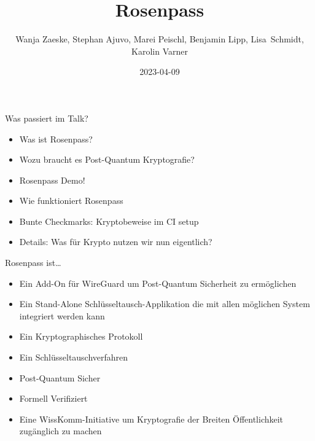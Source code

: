\documentclass{rosenpass-beamer}
\title{Rosenpass}
\author{Wanja Zaeske, Stephan Ajuvo, Marei Peischl, Benjamin Lipp, Lisa~Schmidt, Karolin Varner}
\institute{\url{https://rosenpass.eu}}
\date{2023-04-09}
\begin{document}
\maketitle

\begin{frame}{Was passiert im Talk?}
\begin{itemize}
  \item Was ist Rosenpass?
  \item Wozu braucht es Post-Quantum Kryptografie?
  \item Rosenpass Demo!
  \item Wie funktioniert Rosenpass
  \item Bunte Checkmarks: Kryptobeweise im CI setup
  \item Details: Was für Krypto nutzen wir nun eigentlich?
\end{itemize}
\end{frame}

\begin{frame}{Rosenpass ist…}
\begin{itemize}
  \item Ein Add-On für WireGuard um Post-Quantum Sicherheit zu ermöglichen
  \item Ein Stand-Alone Schlüsseltausch-Applikation die mit allen möglichen System integriert werden kann
\end{itemize}
\begin{itemize}
  \item Ein Kryptographisches Protokoll
  \item Ein Schlüsseltauschverfahren
  \item Post-Quantum Sicher
  \item Formell Verifiziert
  \item Eine WissKomm-Initiative um Kryptografie der Breiten Öffentlichkeit zugänglich zu machen
\end{itemize}
\end{frame}

\end{document}
